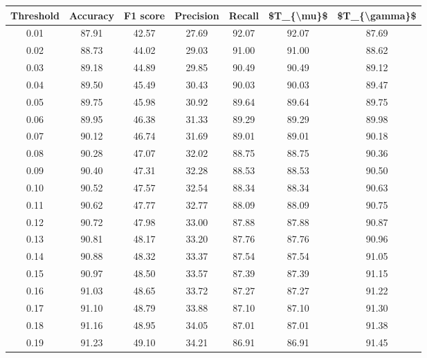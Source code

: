 \begin{tabular}{|c|c|c|c|c|c|c|}
\hline
 Threshold &  Accuracy &  F1 score &  Precision &  Recall &  \$T\_\{\textbackslash mu\}\$ &  \$T\_\{\textbackslash gamma\}\$ \\
\hline
      0.01 &     87.91 &     42.57 &      27.69 &   92.07 &      92.07 &         87.69 \\
      0.02 &     88.73 &     44.02 &      29.03 &   91.00 &      91.00 &         88.62 \\
      0.03 &     89.18 &     44.89 &      29.85 &   90.49 &      90.49 &         89.12 \\
      0.04 &     89.50 &     45.49 &      30.43 &   90.03 &      90.03 &         89.47 \\
      0.05 &     89.75 &     45.98 &      30.92 &   89.64 &      89.64 &         89.75 \\
      0.06 &     89.95 &     46.38 &      31.33 &   89.29 &      89.29 &         89.98 \\
      0.07 &     90.12 &     46.74 &      31.69 &   89.01 &      89.01 &         90.18 \\
      0.08 &     90.28 &     47.07 &      32.02 &   88.75 &      88.75 &         90.36 \\
      0.09 &     90.40 &     47.31 &      32.28 &   88.53 &      88.53 &         90.50 \\
      0.10 &     90.52 &     47.57 &      32.54 &   88.34 &      88.34 &         90.63 \\
      0.11 &     90.62 &     47.77 &      32.77 &   88.09 &      88.09 &         90.75 \\
      0.12 &     90.72 &     47.98 &      33.00 &   87.88 &      87.88 &         90.87 \\
      0.13 &     90.81 &     48.17 &      33.20 &   87.76 &      87.76 &         90.96 \\
      0.14 &     90.88 &     48.32 &      33.37 &   87.54 &      87.54 &         91.05 \\
      0.15 &     90.97 &     48.50 &      33.57 &   87.39 &      87.39 &         91.15 \\
      0.16 &     91.03 &     48.65 &      33.72 &   87.27 &      87.27 &         91.22 \\
      0.17 &     91.10 &     48.79 &      33.88 &   87.10 &      87.10 &         91.30 \\
      0.18 &     91.16 &     48.95 &      34.05 &   87.01 &      87.01 &         91.38 \\
      0.19 &     91.23 &     49.10 &      34.21 &   86.91 &      86.91 &         91.45 \\

\end{tabular}

